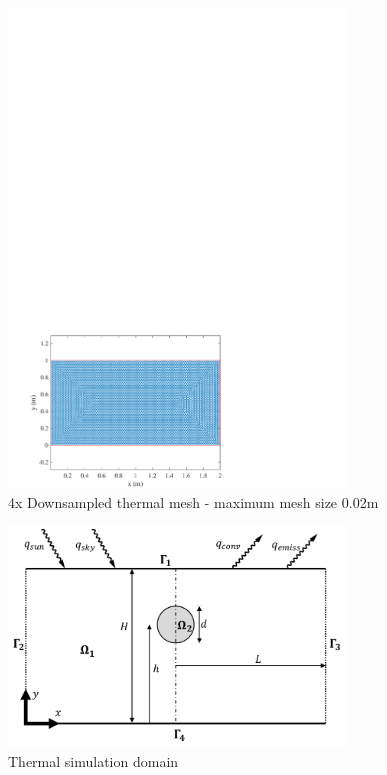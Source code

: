     \begin{figure}[htbp]
        \centering
        \includegraphics[width=0.8\textwidth]{figs/Rory/thermal_mesh.pdf}
        \caption{4x Downsampled thermal mesh - maximum mesh size 0.02m}
        \label{fig:thermal_mesh}
    \end{figure}
    
    
    
    \begin{figure}[htbp]
        \centering
        \includegraphics[width=0.8\textwidth]{figs/Rory/thermal_domain.pdf}
        \caption{Thermal simulation domain}
        \label{fig:thermal_domain}
    \end{figure}

